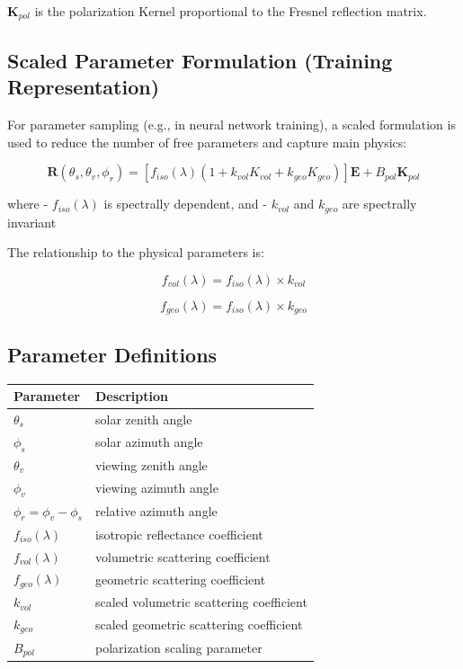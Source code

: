 \documentclass[
  letterpaper,
  open=any]{scrbook}
\begin{document}
\(\mathbf{K}_{pol}\) is the polarization Kernel proportional to the
Fresnel reflection matrix.

\subsection{Scaled Parameter Formulation (Training
Representation)}\label{scaled-parameter-formulation-training-representation}

For parameter sampling (e.g., in neural network training), a scaled
formulation is used to reduce the number of free parameters and capture
main physics:

\[
\mathbf{R}(\theta_s,\theta_v,\phi_r) =
\left[
f_{iso}(\lambda)
\left(
1
+
k_{vol} K_{vol}
+
k_{geo} K_{geo}
\right)
\right]\mathbf{E}
+
B_{pol}\mathbf{K}_{pol}
\]

where - \(f_{iso}(\lambda)\) is spectrally dependent, and - \(k_{vol}\)
and \(k_{geo}\) are spectrally invariant

The relationship to the physical parameters is:

\[
f_{vol}(\lambda) = f_{iso}(\lambda) \times k_{vol}
\]

\[
f_{geo}(\lambda) = f_{iso}(\lambda) \times k_{geo}
\]

\subsection{Parameter Definitions}\label{parameter-definitions}

\begin{longtable}[]{@{}ll@{}}
\toprule\noalign{}
Parameter & Description \\
\midrule\noalign{}
\endhead
\bottomrule\noalign{}
\endlastfoot
\(\theta_s\) & solar zenith angle \\
\(\phi_s\) & solar azimuth angle \\
\(\theta_v\) & viewing zenith angle \\
\(\phi_v\) & viewing azimuth angle \\
\(\phi_r=\phi_v-\phi_s\) & relative azimuth angle \\
\(f_{iso}(\lambda)\) & isotropic reflectance coefficient \\
\(f_{vol}(\lambda)\) & volumetric scattering coefficient \\
\(f_{geo}(\lambda)\) & geometric scattering coefficient \\
\(k_{vol}\) & scaled volumetric scattering coefficient \\
\(k_{geo}\) & scaled geometric scattering coefficient \\
\(B_{pol}\) & polarization scaling parameter \\
\end{longtable}
\end{document}
